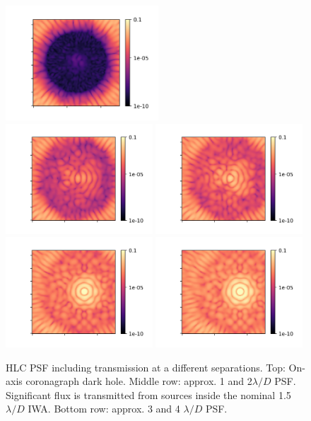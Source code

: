 \documentclass[]{spie}  %
\begin{document}
\begin{figure}[!ht]
    \centering
    \includegraphics[width=0.51\textwidth]{0PSF.png}
    \includegraphics[width=0.49\textwidth]{17PSF_1lambdaD.png}
    \includegraphics[width=0.49\textwidth]{34PSF_2lambdaD.png}
    \includegraphics[width=0.49\textwidth]{51PSF.png}
    \includegraphics[width=0.49\textwidth]{68PSF.png}
    \caption{\acrshort{HLC} \gls{PSF} including transmission at a different separations. Top: On-axis coronagraph dark hole. Middle row: approx. 1 and 2$\lambda/D$ PSF. Significant flux is transmitted from sources inside the nominal 1.5$\lambda/D$ \acrshort{IWA}. Bottom row: approx. 3 and 4 $\lambda/D$ PSF. }
    \label{fig:psfs}
\end{figure}
\end{document}
